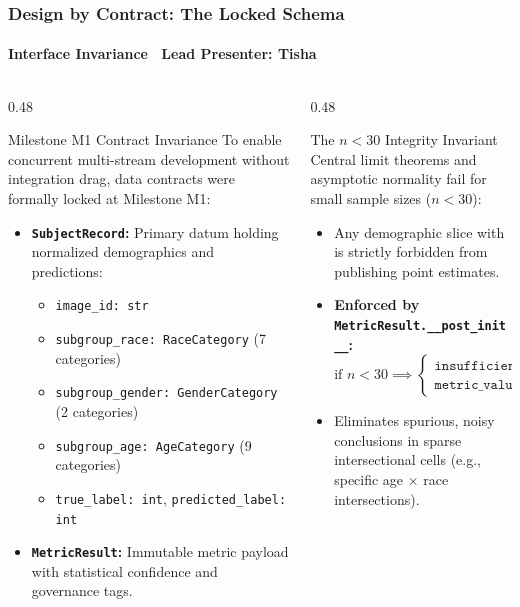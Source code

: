\begin{frame}
  \frametitle{Design by Contract: The Locked Schema}
  \framesubtitle{Interface Invariance \textbar\ Lead Presenter: Tisha}

  \begin{columns}[T]
    \begin{column}{0.48\textwidth}
      \begin{card}{Milestone M1 Contract Invariance}
        \scriptsize
        To enable concurrent multi-stream development without integration drag, data contracts were formally locked at Milestone M1:
        \vspace{0.1cm}
        \begin{itemize}\scriptsize
          \item \textbf{\texttt{SubjectRecord}:} Primary datum holding normalized demographics and predictions:
          \begin{itemize}\tiny
            \item \texttt{image\_id: str}
            \item \texttt{subgroup\_race: RaceCategory} (7 categories)
            \item \texttt{subgroup\_gender: GenderCategory} (2 categories)
            \item \texttt{subgroup\_age: AgeCategory} (9 categories)
            \item \texttt{true\_label: int}, \texttt{predicted\_label: int}
          \end{itemize}
          \item \textbf{\texttt{MetricResult}:} Immutable metric payload with statistical confidence and governance tags.
        \end{itemize}
      \end{card}
    \end{column}

    \begin{column}{0.48\textwidth}
      \begin{alertcard}{The $n < 30$ Integrity Invariant}
        \scriptsize
        Central limit theorems and asymptotic normality fail for small sample sizes ($n < 30$):
        \vspace{0.1cm}
        \begin{itemize}\scriptsize
          \item Any demographic slice with  is strictly forbidden from publishing point estimates.
          \item \textbf{Enforced by \texttt{MetricResult.\_\_post\_init\_\_}:}
          $$\text{if } n < 30 \implies \begin{cases} \texttt{insufficient\_sample} = \text{True} \\ \texttt{metric\_value} = \text{None} \end{cases}$$
          \item Eliminates spurious, noisy conclusions in sparse intersectional cells (e.g., specific age $\times$ race intersections).
        \end{itemize}
      \end{alertcard}


\end{column}
\end{columns}
\end{frame}
